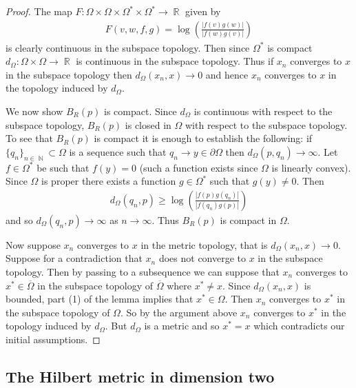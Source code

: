 \documentclass[12pt]{amsart}
\theoremstyle{plain}
\theoremstyle{definition}
\theoremstyle{remark}
\begin{document}
\begin{proof}
The map $F : \Omega \times \Omega \times \Omega^* \times \Omega^* \rightarrow \operatorname{\mathbb{R}}$ given by 
\begin{align*}
F(v,w,f,g) = \log \left( \frac{{\left|{f(v)g(w)}\right|}}{{\left|{f(w)g(v)}\right|}} \right)
\end{align*}
is clearly continuous in the subspace topology. Then since $\Omega^*$ is compact $d_{\Omega} : \Omega \times \Omega \rightarrow \operatorname{\mathbb{R}}$ is continuous in the subspace topology. Thus if $x_n$ converges to $x$ in the subspace topology then $d_{\Omega}(x_n,x) \rightarrow 0$ and hence $x_n$ converges to $x$ in the topology induced by $d_{\Omega}$.

We now show $B_R(p)$ is compact. Since $d_{\Omega}$ is continuous with respect to the subspace topology, $B_R(p)$ is closed in $\Omega$ with respect to the subspace topology. To see that $B_R(p)$ is compact it is enough to establish the following: if $\{q_n\}_{n \in \operatorname{\mathbb{N}}}  \subset \Omega$ is a sequence such that $q_n \rightarrow y \in \partial \Omega$  then $d_{\Omega}(p,q_n) \rightarrow \infty$. Let $f \in \Omega^*$ be such that $f(y)=0$ (such a function exists since $\Omega$ is linearly convex). Since $\Omega$ is proper there exists a function $g \in \Omega^*$ such that $g(y) \neq 0$. Then 
\begin{align*}
d_{\Omega}(q_n,p) \geq \log \left(\frac{{\left|{f(p)g(q_n)}\right|}}{{\left|{f(q_n)g(p)}\right|}}\right)
\end{align*}
and so $d_{\Omega}(q_n,p) \rightarrow \infty$ as $n \rightarrow \infty$. Thus $B_R(p)$ is compact in $\Omega$.

Now suppose $x_n$ converges to $x$ in the metric topology, that is $d_{\Omega}(x_n,x) \rightarrow 0$. Suppose for a contradiction that $x_n$ does not converge to $x$ in the subspace topology. Then by passing to a subsequence we can suppose that $x_n$ converges to $x^* \in \overline{\Omega}$ in the subspace topology of $\overline{\Omega}$ where $x^* \neq x$. Since $d_{\Omega}(x_n,x)$ is bounded, part (1) of the lemma implies that $x^* \in \Omega$. Then $x_n$ converges to $x^*$ in the subspace topology of $\Omega$. So by the argument above $x_n$ converges to $x^*$ in the topology induced by $d_{\Omega}$. But $d_{\Omega}$ is a metric and so $x^*=x$ which contradicts our initial assumptions. 
\end{proof}

\subsection{The Hilbert metric in dimension two}\label{subsec:dim2}
\end{document}
